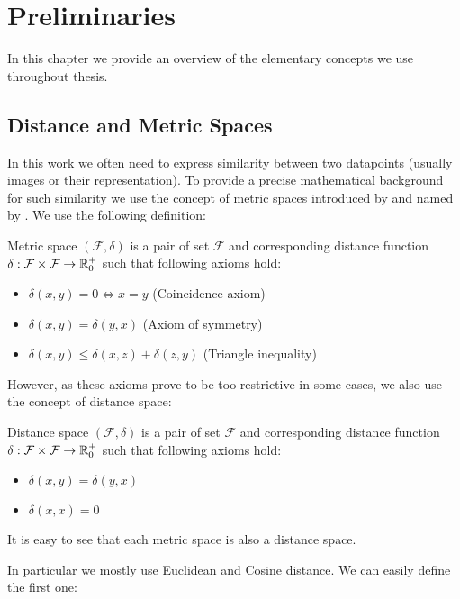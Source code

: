 \chapter{Preliminaries}


In this chapter we provide an overview of the elementary concepts we use
throughout thesis.

\section{Distance and Metric Spaces}

In this work we often need to express similarity between two datapoints
(usually images or their representation). To provide a precise mathematical
background for such similarity we use the concept of metric spaces introduced
by \cite{metric} and named by \cite{metricname}. We use the following definition:

\begin{defn}
Metric space $(\mathcal{F}, \delta)$ is a pair of set $\mathcal{F}$ and
corresponding distance function
$\delta : \mathcal{F} \times \mathcal{F} \rightarrow \mathbb{R}_0^+$ such that
following axioms hold:
\begin{itemize}
    \item $\delta(x, y) = 0 \Leftrightarrow x = y$ (Coincidence axiom)
    \item $\delta(x, y) = \delta(y, x)$ (Axiom of symmetry)
    \item $\delta(x, y) \leq \delta(x, z) + \delta(z, y)$ (Triangle inequality)
\end{itemize}
\end{defn}%
However, as these axioms prove to be too restrictive in some cases, we also
use the concept of distance space:
\begin{defn}
Distance space $(\mathcal{F}, \delta)$ is a pair of set $\mathcal{F}$ and
corresponding distance function $\delta : \mathcal{F} \times \mathcal{F} \rightarrow \mathbb{R}_0^+$ such that
following axioms hold:
\begin{itemize}
    \item $\delta(x, y) = \delta(y, x)$
    \item $\delta(x, x) = 0$
\end{itemize}
\end{defn}%
It is easy to see that each metric space is also a distance space.

In particular we mostly use Euclidean and Cosine distance. We can easily define
the first one:


